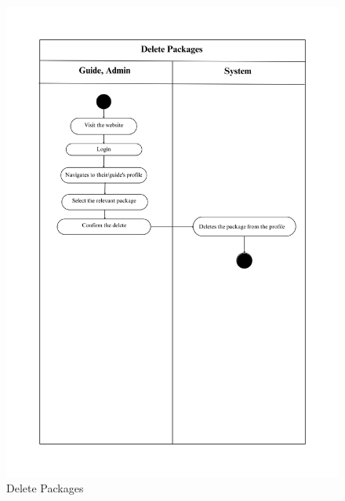 \begin{figure}[h!]
    \centering
    \includegraphics[width=1\textwidth]{Images/Activity Diagrams/16 Delete Packages.png}
    \caption{Delete Packages}
    \label{fig:activity-delete-packages}
\end{figure}

